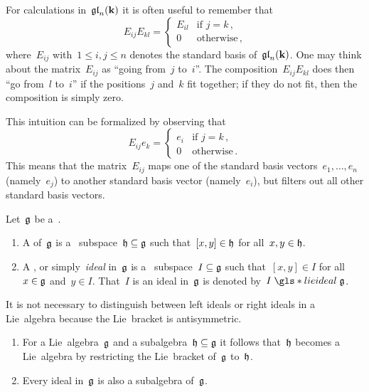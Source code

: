 \begin{recall}
  For calculations in~$\mathfrak{gl}_n(\mathbf{k})$ it is often useful to remember that
  \[
    E_{ij} E_{kl}
    =
    \begin{cases}
      E_{il}  & \text{if~$j = k$} \,, \\
      0       & \text{otherwise}  \,,
    \end{cases}
  \]
  where~$E_{ij}$ with~$1 \leq i,j \leq n$ denotes the standard basis of~$\mathfrak{gl}_n(\mathbf{k})$.
  One may think about the matrix~$E_{ij}$ as \enquote{going from~$j$ to~$i$}.
  The composition~$E_{ij} E_{kl}$ does then \enquote{go from~$l$ to~$i$} if the positions~$j$ and~$k$ fit together;
  if they do not fit, then the composition is simply zero.
  
  This intuition can be formalized by observing that
  \[
    E_{ij} e_k
    =
    \begin{cases}
      e_i & \text{if~$j = k$} \,, \\
      0   & \text{otherwise}  \,.
    \end{cases}
  \]
  This means that the matrix~$E_{ij}$ maps one of the standard basis vectors~$e_1, \dotsc, e_n$ (namely~$e_j$) to another standard basis vector (namely~$e_i$), but filters out all other standard basis vectors.
\end{recall}



\begin{definition}
  Let~$\mathfrak{g}$ be a~{\liealgebra{$\kf$}}.
  \begin{enumerate}
    \item
      A  of~$\mathfrak{g}$ is a~{\linear{$\kf$}} subspace~$\mathfrak{h} \subseteq \mathfrak{g}$ such that~$[x,y] \in \mathfrak{h}$ for all~$x, y \in \mathfrak{h}$.
    \item
      A , or simply~\emph{ideal} in~$\mathfrak{g}$ is a~{\linear{$\kf$}} subspace~$I \subseteq \mathfrak{g}$ such that~$[x,y] \in I$ for all~$x \in \mathfrak{g}$ and~$y \in I$.
      That~$I$ is an ideal in~$\mathfrak{g}$ is denoted by~$I \mathrel{\gls*{lie ideal}} \glie$.
  \end{enumerate}
\end{definition}


\begin{remark}
  It is not necessary to distinguish between left ideals or right ideals in a Lie~algebra because the Lie~bracket is antisymmetric.
\end{remark}


\begin{remark}
  \leavevmode
  \begin{enumerate}
    \item
      For a Lie~algebra~$\mathfrak{g}$ and a subalgebra~$\mathfrak{h} \subseteq \mathfrak{g}$ it follows that~$\mathfrak{h}$ becomes a Lie~algebra by restricting the Lie~bracket of~$\mathfrak{g}$ to~$\mathfrak{h}$.
    \item
      Every ideal in~$\mathfrak{g}$ is also a subalgebra of~$\mathfrak{g}$.
  \end{enumerate}
\end{remark}


